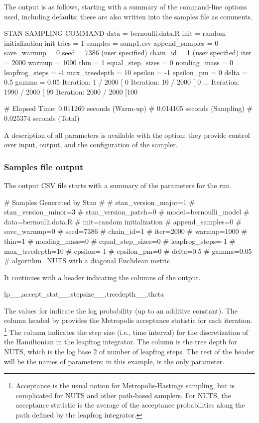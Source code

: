 \documentclass[article]{jss}
\begin{document}
The output is as follows, starting with a summary of the command-line
options used, including defaults;  these are also written into the 
samples file as comments.
%
\begin{Code}
STAN SAMPLING COMMAND
data = bernoulli.data.R
init = random initialization
init tries = 1
samples = samp1.csv
append_samples = 0
save_warmup = 0
seed = 7386 (user specified)
chain_id = 1 (user specified)
iter = 2000
warmup = 1000
thin = 1
equal_step_sizes = 0
nondiag_mass = 0
leapfrog_steps = -1
max_treedepth = 10
epsilon = -1
epsilon_pm = 0
delta = 0.5
gamma = 0.05
Iteration:    1 / 2000 [  0%
Iteration:   10 / 2000 [  0%
...
Iteration: 1990 / 2000 [ 99%
Iteration: 2000 / 2000 [100%

# Elapsed Time: 0.011269 seconds (Warm-up)
#               0.014105 seconds (Sampling)
#               0.025374 seconds (Total)
\end{Code}
%
A description of all parameters is available with the 
option; they provide control over input, output, and the configuration
of the sampler.

\subsubsection{Samples file output}

The output CSV file starts with a summary of the parameters for the
run.  
%
\begin{Code}
# Samples Generated by Stan
#
# stan_version_major=1
# stan_version_minor=3
# stan_version_patch=0
# model=bernoulli_model
# data=bernoulli.data.R
# init=random initialization
# append_samples=0
# save_warmup=0
# seed=7386
# chain_id=1
# iter=2000
# warmup=1000
# thin=1
# nondiag_mass=0
# equal_step_sizes=0
# leapfrog_steps=-1
# max_treedepth=10
# epsilon=-1
# epsilon_pm=0
# delta=0.5
# gamma=0.05
# algorithm=NUTS with a diagonal Euclidean metric
\end{Code}
%
It continues with a header indicating the columns of the output.
%
\begin{Code}
lp__,accept_stat__,stepsize__,treedepth__,theta
\end{Code}
%
The values for  indicate the log probability (up to an
additive constant).  The column headed by 
provides the Metropolis acceptance statistic for each iteration.%
\footnote{Acceptance is the usual notion for Metropolis-Hastings
  sampling, but is complicated for NUTS and other path-based samplers.
  For NUTS, the acceptance statistic is the average of the acceptance
  probabilities along the path defined by the leapfrog integrator.}
The column  indicates the step size (i.e., time
interval) for the discretization of the Hamiltonian in the leapfrog
integrator.  The column  is the tree depth for
NUTS, which is the log base 2 of number of leapfrog steps.  
The rest of the header will be the names of parameters; in this
example,  is the only parameter.
\end{document}
